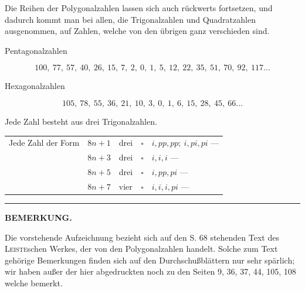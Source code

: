 \NoSourceHead
{}
\par\indent Die Reihen der Polygonalzahlen lassen sich auch rückwerts fortsetzen,
und dadurch kommt man bei allen, die Trigonalzahlen und Quadratzahlen
ausgenommen, auf Zahlen, welche von den übrigen ganz verschieden sind.
\begin{center}Pentagonalzahlen\end{center}
\[
100,\ 77,\ 57,\ 40,\ 26,\ 15,\ 7,\ 2,\ 0,\ 1,\ 5,\ 12,\ 22,\ 35,\ 51,\ 70,\ 92,\ 117\ldots
\]
\begin{center}Hexagonalzahlen\end{center}
\[
105,\ 78,\ 55,\ 36,\ 21,\ 10,\ 3,\ 0,\ 1,\ 6,\ 15,\ 28,\ 45,\ 66\ldots
\]
\par\indent Jede Zahl besteht aus drei Trigonalzahlen.
\par\noindent\hspace*{\parindent}\begin{tabular}{@{}lclcl@{}}
Jede Zahl der Form&$8n+1$&drei&$\square$&$i,pp,pp;\ i,pi,pi$ —\\
&$8n+3$&drei&$\square$&$i,i,i$ —\\
&$8n+5$&drei&$\square$&$i,pp,pi$ —\\
&$8n+7$&vier&$\square$&$i,i,i,pi$ —
\end{tabular}
\par\vfill\noindent\rule{.25\linewidth}{.4pt}\par\smallskip
\begingroup\footnotesize
{}\par
\endgroup\clearpage
{}
\begin{center}\textbf{BEMERKUNG.}\end{center}
\begingroup\small
\par\indent Die vorstehende Aufzeichnung bezieht sich auf den S. 68 stehenden Text des \textsc{Leiste}schen Werkes,
der von den Polygonalzahlen handelt. Solche zum Text gehörige Bemerkungen finden sich auf den Durchschußblättern nur sehr spärlich; wir haben außer der hier abgedruckten noch zu den Seiten 9, 36, 37, 44,
105, 108 welche bemerkt.

